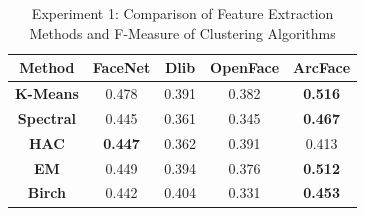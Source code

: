 \documentclass[12pt,english]{article}
\begin{document}
\begin{table}[h!]
\centering
\begin{tabular}{||c c c c c||} 
 \hline
Method & FaceNet & Dlib & OpenFace & ArcFace\\ [0.5ex]
 \hline\hline
 \textbf{K-Means} & 0.478 & 0.391 & 0.382 & \textbf{0.516}\\ 
 \hline
  \textbf{Spectral} & 0.445 & 0.361 & 0.345 & \textbf{0.467}\\
 \hline
 \textbf{HAC} & \textbf{0.447} & 0.362 & 0.391 & 0.413\\
 \hline
 \textbf{EM} & 0.449 & 0.394 & 0.376 & \textbf{0.512}\\
 \hline
 \textbf{Birch} & 0.442 & 0.404 & 0.331 & \textbf{0.453}\\
 \hline
\end{tabular}
\caption{Experiment 1: Comparison of Feature Extraction Methods and F-Measure of Clustering Algorithms}
\label{table:ex1}
\end{table}
\end{document}

